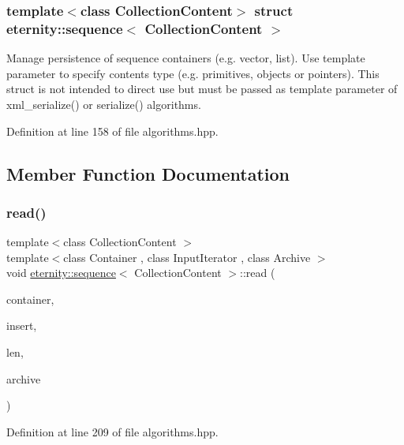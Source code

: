 \subsubsection*{template$<$class Collection\+Content$>$\newline
struct eternity\+::sequence$<$ Collection\+Content $>$}

Manage persistence of sequence containers (e.\+g. vector, list). Use template parameter to specify contents type (e.\+g. primitives, objects or pointers). This struct is not intended to direct use but must be passed as template parameter of xml\+\_\+serialize() or serialize() algorithms. 

Definition at line 158 of file algorithms.\+hpp.



\subsection{Member Function Documentation}
\mbox{\label{structeternity_1_1sequence_ac0bc259640bda1d30744b14c59539d20}} 
\subsubsection{\texorpdfstring{read()}{read()}}
{\footnotesize\ttfamily template$<$class Collection\+Content $>$ \\
template$<$class Container , class Input\+Iterator , class Archive $>$ \\
void \hyperlink{structeternity_1_1sequence}{eternity\+::sequence}$<$ Collection\+Content $>$\+::read (\begin{DoxyParamCaption}\item[{Container \&}]{container,  }\item[{Input\+Iterator}]{insert,  }\item[{size\+\_\+t}]{len,  }\item[{Archive \&}]{archive }\end{DoxyParamCaption})}



Definition at line 209 of file algorithms.\+hpp.

\mbox{\label{structeternity_1_1sequence_a5339872e64fcb9636ef080e5b932658a}} 
